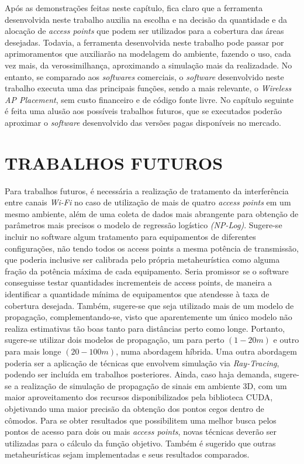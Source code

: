 \documentclass[
	12pt,				%
	twoside,			%
	a4paper,			%
	english,			%
	french,				%
	spanish,			%
	brazil				%
	]{abntex2}
\begin{document}
Após as demonstrações feitas neste capítulo, fica claro que a ferramenta
desenvolvida neste trabalho auxilia na escolha e na decisão da
quantidade e da alocação de \emph{access points} que podem ser
utilizados para a cobertura das áreas desejadas. Todavia, a ferramenta
desenvolvida neste trabalho pode passar por aprimoramentos que
auxiliarão na modelagem do ambiente, fazendo o uso, cada vez mais, da
verossimilhança, aproximando a simulação mais da realizadade. No
entanto, se comparado aos \emph{softwares} comerciais, o \emph{software}
desenvolvido neste trabalho executa uma das principais funções, sendo a
mais relevante, o \emph{Wireless AP Placement}, sem custo financeiro e
de código fonte livre. No capítulo seguinte é feita uma alusão aos
possíveis trabalhos futuros, que se executados poderão aproximar o
\emph{software} desenvolvido das versões pagas disponíveis no mercado.

\chapter{TRABALHOS FUTUROS}\label{sec:futuros}

Para trabalhos futuros, é necessária a realização de tratamento da
interferência entre canais \emph{Wi-Fi} no caso de utilização de mais de
quatro \emph{access points} em um mesmo ambiente, além de uma coleta de
dados mais abrangente para obtenção de parâmetros mais precisos o modelo
de regressão logístico \emph{(NP-Log)}. Sugere-se incluir no software
algum tratamento para equipamentos de diferentes configurações, não
tendo todos os access points a mesma potência de transmissão, que
poderia inclusive ser calibrada pelo própria metaheurística como alguma
fração da potência máxima de cada equipamento. Seria promissor se o
software conseguisse testar quantidades incrementeis de access points,
de maneira a identificar a quantidade mínima de equipamentos que
atendesse à taxa de cobertura desejada. Também, sugere-se que seja
utilizado mais de um modelo de propagação, complementando-se, visto que
aparentemente um único modelo não realiza estimativas tão boas tanto
para distâncias perto como longe. Portanto, sugere-se utilizar dois
modelos de propagação, um para perto \((1-20 m)\) e outro para mais
longe \((20-100 m)\), numa abordagem híbrida. Uma outra abordagem
poderia ser a aplicação de técnicas que envolvem simulação via
\emph{Ray-Tracing}, podendo ser incluída em trabalhos posteriores.
Ainda, caso haja demanda, sugere-se a realização de simulação de
propagação de sinais em ambiente 3D, com um maior aproveitamento dos
recursos disponibilizados pela biblioteca CUDA, objetivando uma maior
precisão da obtenção dos pontos cegos dentro de cômodos. Para se obter
resultados que possibilitem uma melhor busca pelos pontos de acesso para
dois ou mais \emph{access points}, novas técnicas deverão ser utilizadas
para o cálculo da função objetivo. Também é sugerido que outras
metaheurísticas sejam implementadas e seus resultados comparados.
\end{document}
